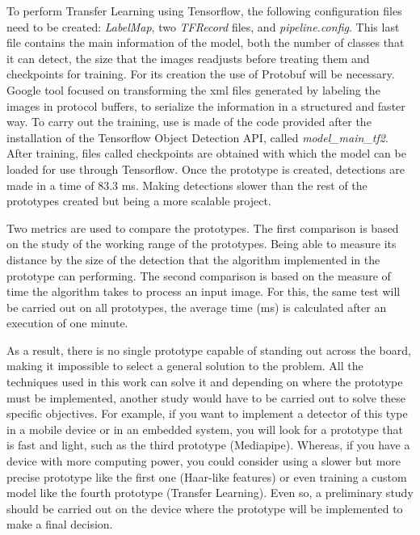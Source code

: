 \vspace{-0.3cm}
To perform Transfer Learning using Tensorflow, the following configuration files need to be created: \textit{LabelMap}, two \textit{TFRecord} files, and \textit{pipeline.config}. This last file contains the main information of the model, both the number of classes that it can detect, the size that the images readjusts before treating them and checkpoints for training. For its creation the use of Protobuf will be necessary. Google tool focused on transforming the xml files generated by labeling the images in protocol buffers, to serialize the information in a structured and faster way. To carry out the training, use is made of the code provided after the installation of the Tensorflow Object Detection API, called \textit{model\_main\_tf2}. After training, files called checkpoints are obtained with which the model can be loaded for use through Tensorflow. Once the prototype is created, detections are made in a time of 83.3 ms. Making detections slower than the rest of the prototypes created but being a more scalable project.

\vspace{-0.3cm}
Two metrics are used to compare the prototypes. The first comparison is based on the study of the working range of the prototypes. Being able to measure its distance by the size of the detection that the algorithm implemented in the prototype can performing. The second comparison is based on the measure of time the algorithm takes to process an input image. For this, the same test will be carried out on all prototypes, the average time (ms) is calculated after an execution of one minute.

\vspace{-0.3cm}
As a result, there is no single prototype capable of standing out across the board, making it impossible to select a general solution to the problem. All the techniques used in this work can solve it and depending on where the prototype must be implemented, another study would have to be carried out to solve these specific objectives. For example, if you want to implement a detector of this type in a mobile device or in an embedded system, you will look for a prototype that is fast and light, such as the third prototype (Mediapipe). Whereas, if you have a device with more computing power, you could consider using a slower but more precise prototype like the first one (Haar-like features) or even training a custom model like the fourth prototype (Transfer Learning). Even so, a preliminary study should be carried out on the device where the prototype will be implemented to make a final decision.


